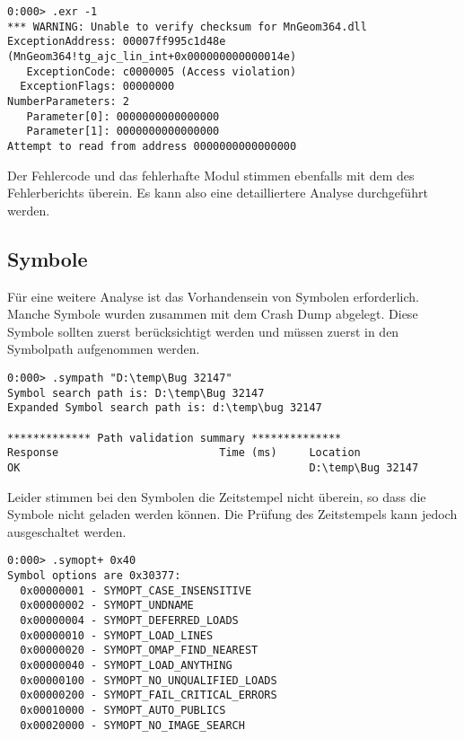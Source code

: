 \begin{lstlisting}[language=WinDbg]
0:000> .exr -1
*** WARNING: Unable to verify checksum for MnGeom364.dll
ExceptionAddress: 00007ff995c1d48e (MnGeom364!tg_ajc_lin_int+0x000000000000014e)
   ExceptionCode: c0000005 (Access violation)
  ExceptionFlags: 00000000
NumberParameters: 2
   Parameter[0]: 0000000000000000
   Parameter[1]: 0000000000000000
Attempt to read from address 0000000000000000
\end{lstlisting}
Der Fehlercode und das fehlerhafte Modul stimmen ebenfalls mit dem des Fehlerberichts überein. Es kann also eine detailliertere Analyse durchgeführt werden.

\subsection{Symbole}
Für eine weitere Analyse ist das Vorhandensein von Symbolen erforderlich. Manche Symbole wurden zusammen mit dem Crash Dump abgelegt.
Diese Symbole sollten zuerst berücksichtigt werden und müssen zuerst in den Symbolpath aufgenommen werden.
\begin{lstlisting}[language=WinDbg]
0:000> .sympath "D:\temp\Bug 32147"
Symbol search path is: D:\temp\Bug 32147
Expanded Symbol search path is: d:\temp\bug 32147

************* Path validation summary **************
Response                         Time (ms)     Location
OK                                             D:\temp\Bug 32147
\end{lstlisting}

Leider stimmen bei den Symbolen die Zeitstempel nicht überein, so dass die Symbole nicht geladen werden können.
Die Prüfung des Zeitstempels kann jedoch ausgeschaltet werden.
\begin{lstlisting}[language=WinDbg]
0:000> .symopt+ 0x40
Symbol options are 0x30377:
  0x00000001 - SYMOPT_CASE_INSENSITIVE
  0x00000002 - SYMOPT_UNDNAME
  0x00000004 - SYMOPT_DEFERRED_LOADS
  0x00000010 - SYMOPT_LOAD_LINES
  0x00000020 - SYMOPT_OMAP_FIND_NEAREST
  0x00000040 - SYMOPT_LOAD_ANYTHING
  0x00000100 - SYMOPT_NO_UNQUALIFIED_LOADS
  0x00000200 - SYMOPT_FAIL_CRITICAL_ERRORS
  0x00010000 - SYMOPT_AUTO_PUBLICS
  0x00020000 - SYMOPT_NO_IMAGE_SEARCH
\end{lstlisting}

